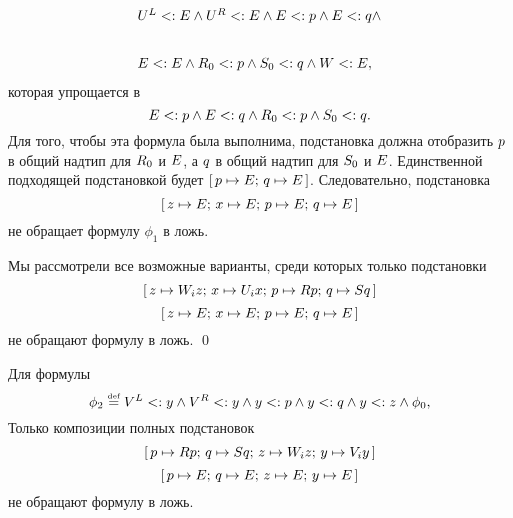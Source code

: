 \begin{proof*}
\begin{itemize}
\[            \begin{array}{l}
                {U}^{L} <: {E} \land {U}^{R} <: {E} \land {E} <: p \land {E} <: q \land \\[1em]\\ {E} <: {E} \land {R}_{0} <: p \land {S}_{0} <: q \land {W} <: {E},
            \end{array}
        \] которая упрощается в 
        \[
            {E} <: p \land {E} <: q \land {R}_{0} <: p \land {S}_{0} <: q.
        \]
        Для того, чтобы эта формула была выполнима, подстановка должна отобразить $p$ в общий надтип для ${R}_{0}$ и ${E}$, а $q$ в общий надтип для ${S}_{0}$ и ${E}$. Единственной подходящей подстановкой будет $\textrm{[} \, p \mapsto {E}; \, q \mapsto {E} \, \textrm{]}$. Следовательно, подстановка
        \[
            \textrm{[} \, z \mapsto {E}; \, x \mapsto {E}; \, p \mapsto {E}; \, q \mapsto {E} \, \textrm{]}
        \] не обращает формулу $\phi_{1}$ в ложь.
        
\end{itemize}
Мы рассмотрели все возможные варианты, среди которых только подстановки
\[
    \textrm{[} \, z \mapsto {W}_{i}z; \, x \mapsto {U}_{i}x; \, p \mapsto {R}p; \, q \mapsto {S}q \, \textrm{]}
\]
\[
    \textrm{[} \, z \mapsto {E}; \, x \mapsto {E}; \, p \mapsto {E}; \, q \mapsto {E} \, \textrm{]}
\] не обращают формулу в ложь.
\qed\end{proof*}
%
\begin{lem}{\label{lem:pcpphi2}}
Для формулы
\[
    \phi_{2} \mathrel{\stackrel{\mbox{\normalfont\tiny def}}{=}} {V}^{L} <: y \land {V}^{R} <: y \land y <: p \land y <: q \land y <: z \land \phi_{0},
\]
Только композиции полных подстановок
\[
    \textrm{[} \, p \mapsto {R}p; \, q \mapsto {S}q; \,
    z \mapsto {W}_{i}z; \,
    y \mapsto {V}_{i}y \, \textrm{]}
\]
\[
    \textrm{[} \, p \mapsto {E}; \, q \mapsto {E}; \,
    z \mapsto {E}; \, y \mapsto {E} \, \textrm{]}
\] не обращают формулу в ложь.
\end{lem}
